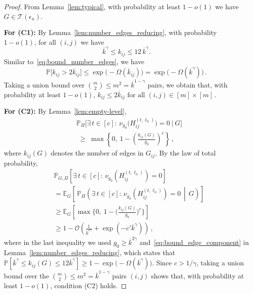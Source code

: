 \documentclass[journal]{IEEEtran}
\theoremstyle{definition}
\theoremstyle{definition}
\newcommand{\Tc}{\mathcal{T}}
\newcommand{\EE}{\mathbb{E}}
\newcommand{\PP}{\mathbb{P}}
\newcommand{\PV}{\nu}
\newcommand{\kb}{\overline{k}}
\newcommand{\bigO}{\mathcal{O}}
\begin{document}
\begin{proof}
From Lemma~\ref{lem:typical}, with probability at least $1-o(1)$ we have $G \in \Tc(\epsilon_n)$. 

\medskip\noindent
\textbf{For (C1):} By Lemma~\ref{lem:number_edges_reducing}, with probability $1-o(1)$, for all $(i,j)$ we have
\[
  \kb^{\gamma} \le k_{ij} \le 12\,\kb^{\gamma}.
\]
Similar to~\eqref{eq:bound_number_edges}, we have
\[
\PP\big[k_{ij} > 2\kb_{ij}\big] \le \exp \big(-\Omega(\kb_{ij})\big) = \exp \big(-\Omega(\kb^{\gamma})\big) \, .
\]
Taking a union bound over $\binom{m}{2} \le m^2 = \kb^{1-\gamma}$ pairs, we obtain that, with probability at least $1-o(1)$, $k_{ij} \le 2\kb_{ij} \text{ for all }(i,j)\in[m]\times[m] \,$.

\medskip\noindent
\textbf{For (C2):} By Lemma~\ref{lem:empty-level}, 
\begin{align*}
    &\PP_{\Pi}\Big[\exists\,t\in[c]:\ 
       \PV_{g_0}\big(H^{(t,\ell_0)}_{ij}\big)=0\ \Big|\ G\Big] \\
    &\;\ge\; \max \left\{0,\ 1 - \left(\frac{k_{ij}(G)}{g_0}\right)^{c}\right\} \, ,
\end{align*}
where $k_{ij}(G)$ denotes the number of edges in $G_{ij}$. By the law of total probability,  
\begin{align*}
&\PP_{G,\Pi}\left[\exists\,t\in[c]:\, \PV_{g_0}\left(H^{(t,\ell_0)}_{ij}\right)=0\right] \\
&= \EE_{G}\left[\,\PP_{\Pi}\left(\exists\,t\in[c]:\, \PV_{g_0} \left(H^{(t,\ell_0)}_{ij}\right)=0 \,\middle|\, G\right)\right] \\
&\ge \EE_{G} \left[ \max\Big\{0,\ 1 - \Big(\tfrac{k_{ij}(G)}{g_0}\Big)^{c}\Big\} \right] \\
&\ge 1 - \bigO \left( \frac{1}{\kb^{c \gamma}} + \exp(-c'\kb^{\gamma})\right)\, ,
\end{align*}
where in the last inequality we used $g_0 \geq  \kb^{2\gamma}$ and~\eqref{eq:bound_edge_component} in Lemma~\ref{lem:number_edges_reducing}, 
which states that $\PP[\kb^{\gamma} \leq k_{ij}(G) \leq 12\kb^{\gamma}] \geq 1 - \exp \big(-\Omega(\kb^{\gamma}) \big)$. Since $c> 1/\gamma$, taking a union bound over the $ \binom{m}{2} \leq m^2 = \kb^{1-\gamma}$ pairs $(i,j)$ shows that, with probability at least $1-o(1)$, condition (C2) holds.


\end{proof}
\end{document}
